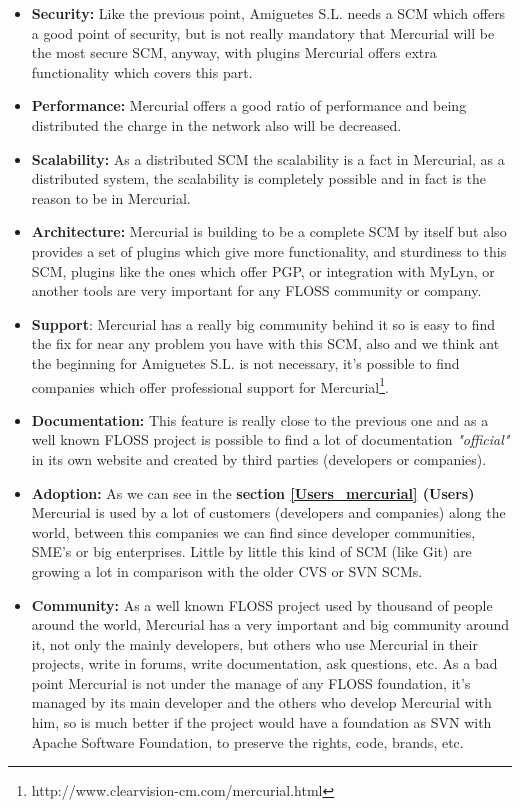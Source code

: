 \documentclass[a4paper,10pt]{article}
\begin{document}
\begin{itemize}
\item \textbf{Security:}
Like the previous point, Amiguetes S.L. needs a SCM which offers a good point of
security, but is not really mandatory
that Mercurial will be the most secure SCM, anyway, with plugins Mercurial
offers extra functionality which
covers this part.

\item \textbf{Performance:}
Mercurial offers a good ratio of performance and being distributed the charge in
the network also will be decreased.

\item \textbf{Scalability:}
As a distributed SCM the scalability is a fact in Mercurial, as a distributed
system, the scalability is completely
possible and in fact is the reason to be in Mercurial.

\item \textbf{Architecture:}
Mercurial is building to be a complete SCM by itself but also provides a set of
plugins which give more functionality, and sturdiness to this SCM, plugins like
the ones which offer PGP, or integration with MyLyn, or another tools are
very important for any FLOSS community or company.

\item \textbf{Support}:
Mercurial has a really big community behind it so is easy to find the fix for
near any problem you have with this SCM, also and we think ant the beginning for
Amiguetes S.L. is not necessary, it's possible to find companies which offer
professional support for
Mercurial\footnote{http://www.clearvision-cm.com/mercurial.html}.

\item \textbf{Documentation:}
This feature is really close to the previous one and as a well known FLOSS
project is possible to find a lot of documentation \textit{"official"} in its
own website and created by third parties (developers or companies).

\item \textbf{Adoption:}
As we can see in the \textbf{section \ref{Users_mercurial} (Users)} Mercurial is
used by a lot of customers (developers and companies) along the world, between
this companies we can find since developer communities, SME's or big
enterprises.
Little by little this kind of SCM (like Git) are growing a lot in comparison
with the older CVS or SVN SCMs.

\item \textbf{Community:}
As a well known FLOSS project used by thousand of people around the world,
Mercurial has a very important and big community around it, not only the mainly
developers, but others who use Mercurial in their projects, write in forums,
write documentation, ask questions, etc.
As a bad point Mercurial is not under the manage of any FLOSS foundation, it's
managed by its main developer and the others who develop Mercurial with him, so
is much better if the project would have a foundation as SVN with Apache
Software Foundation, to preserve the rights, code, brands, etc.


\end{itemize}
\end{document}
